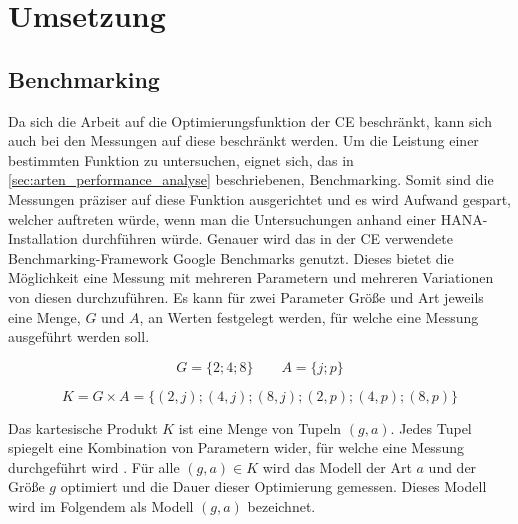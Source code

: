 \chapter{Umsetzung}

\section{Benchmarking}

Da sich die Arbeit auf die Optimierungsfunktion der \ac{CE} beschränkt, kann
sich auch bei den Messungen auf diese beschränkt werden. Um die Leistung einer
bestimmten Funktion zu untersuchen, eignet sich, das in
\autoref{sec:arten_performance_analyse} beschriebenen, Benchmarking. Somit sind
die Messungen präziser auf diese Funktion ausgerichtet und es wird Aufwand
gespart, welcher auftreten würde, wenn man die Untersuchungen anhand einer
HANA-Installation durchführen würde. Genauer wird das in der \ac{CE} verwendete
Benchmarking-Framework Google Benchmarks genutzt. Dieses bietet die Möglichkeit
eine Messung mit mehreren Parametern und mehreren Variationen von diesen
durchzuführen. Es kann \zB für zwei Parameter Größe und Art jeweils eine Menge,
$G$ und $A$, an Werten festgelegt werden, für welche eine
Messung ausgeführt werden soll.

\begin{equation*}
    G=\{2;4;8\}
    \qquad A=\{j;p\}
\end{equation*}


\begin{equation*}
    K = G \times A = \{(2,j);(4,j);(8,j);(2,p);(4,p);(8,p)\}
\end{equation*}

Das kartesische Produkt $K$ ist eine Menge von Tupeln $(g,a)$. Jedes Tupel
spiegelt eine Kombination von Parametern wider, für welche eine Messung
durchgeführt wird \autocite[vgl.][50]{Mengenlehre}. Für alle $(g,a) \in K$ wird
das Modell der Art $a$ und der Größe $g$ optimiert und die Dauer dieser
Optimierung gemessen. Dieses Modell wird im Folgendem als Modell $(g,a)$
bezeichnet.

